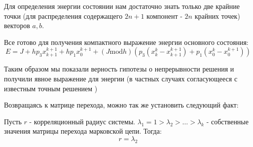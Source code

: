 Для определения энергии состоянии нам достаточно знать только две крайние точки (для распределения содержащего $2n+1$ компонент - $2n$ крайних точек)  векторов $a, b$.

Все готово для получения компактного выражение энергии основного состояния:
		\[
		E = J + h p_3 x^{k+1}_{k+1}  + h p_1 x^{k+1}_0 + (J \text{mod} h) (p_3 (x^k_k - x^{k+1}_{k+1}) +p_1(x^k_0-x^{k+1}_0))
		\]

Таким образом мы показали верность гипотезы о непрерывности решения и получили явное выражение для энергии (в частных случаях согласующееся с известным точным решением \cite{nieuwenhuizen1986exactly})

Возвращаясь к матрице перехода, можно так же установить следующий факт:
\begin{ut}
	Пусть $r$ - корреляционный радиус системы. $\lambda_1 = 1 > \lambda_2 > \dots >\lambda_k$ - собственные значения матрицы перехода марковской цепи. Тогда:
	\[
	r = \lambda_2
	\]

\newpage


\end{ut}